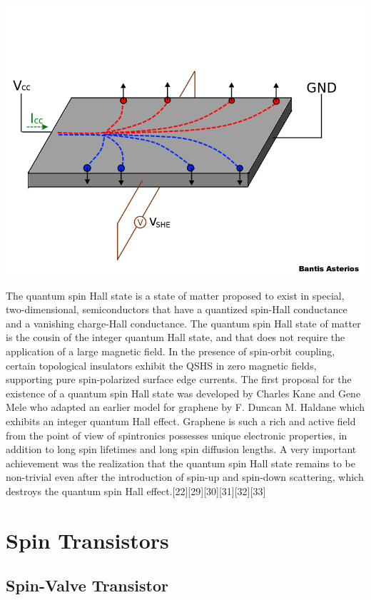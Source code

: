 \documentclass{article}
\begin{document}
\begin{center}
\includegraphics[scale=0.35]{spinhalleffect.png}
\end{center}

The quantum spin Hall state is a state of matter proposed to exist in special, two-dimensional, semiconductors that have a quantized spin-Hall conductance and a vanishing charge-Hall conductance. The quantum spin Hall state of matter is the cousin of the integer quantum Hall state, and that does not require the application of a large magnetic field. In the presence of spin-orbit coupling, certain topological insulators exhibit the QSHS in zero magnetic fields, supporting pure spin-polarized surface edge currents. The first proposal for the existence of a quantum spin Hall state was developed by Charles Kane and Gene Mele who adapted an earlier model for graphene by F. Duncan M. Haldane which exhibits an integer quantum Hall effect. Graphene is such a rich and active field from the point of view of spintronics possesses unique electronic properties, in addition to long spin lifetimes and long spin diffusion lengths. A very important achievement was the realization that the quantum spin Hall state remains to be non-trivial even after the introduction of spin-up and spin-down scattering, which destroys the quantum spin Hall effect.[22][29][30][31][32][33]

\section{Spin Transistors}

\subsection{Spin-Valve Transistor}
\end{document}
